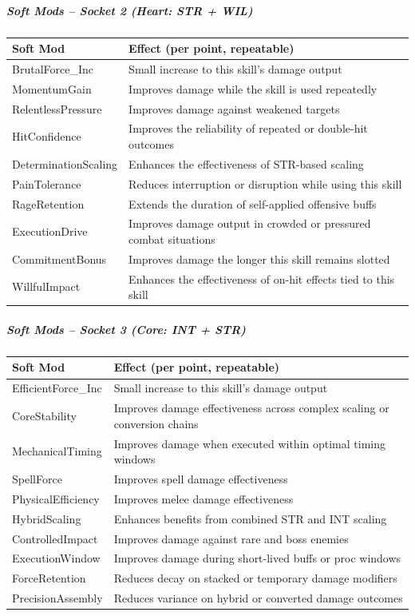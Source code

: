 \subparagraph{Soft Mods -- Socket 2 (Heart: STR + WIL)}
\begin{tabular}{l|p{9.5cm}}
	\textbf{Soft Mod} & \textbf{Effect (per point, repeatable)} \\ \hline
	BrutalForce\_Inc & Small increase to this skill’s damage output \\
	MomentumGain & Improves damage while the skill is used repeatedly \\
	RelentlessPressure & Improves damage against weakened targets \\
	HitConfidence & Improves the reliability of repeated or double-hit outcomes \\
	DeterminationScaling & Enhances the effectiveness of STR-based scaling \\
	PainTolerance & Reduces interruption or disruption while using this skill \\
	RageRetention & Extends the duration of self-applied offensive buffs \\
	ExecutionDrive & Improves damage output in crowded or pressured combat situations \\
	CommitmentBonus & Improves damage the longer this skill remains slotted \\
	WillfulImpact & Enhances the effectiveness of on-hit effects tied to this skill \\
\end{tabular}

\subparagraph{Soft Mods -- Socket 3 (Core: INT + STR)}
\begin{tabular}{l|p{9.5cm}}
	\textbf{Soft Mod} & \textbf{Effect (per point, repeatable)} \\ \hline
	EfficientForce\_Inc & Small increase to this skill’s damage output \\
	CoreStability & Improves damage effectiveness across complex scaling or conversion chains \\
	MechanicalTiming & Improves damage when executed within optimal timing windows \\
	SpellForce & Improves spell damage effectiveness \\
	PhysicalEfficiency & Improves melee damage effectiveness \\
	HybridScaling & Enhances benefits from combined STR and INT scaling \\
	ControlledImpact & Improves damage against rare and boss enemies \\
	ExecutionWindow & Improves damage during short-lived buffs or proc windows \\
	ForceRetention & Reduces decay on stacked or temporary damage modifiers \\
	PrecisionAssembly & Reduces variance on hybrid or converted damage outcomes \\
\end{tabular}

